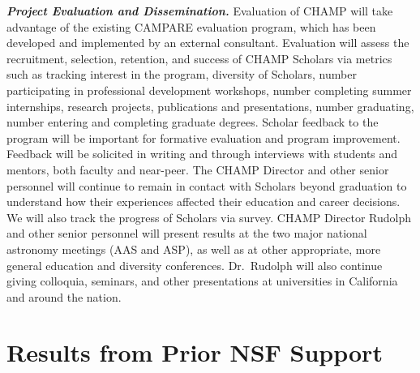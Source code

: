 \documentclass[preprint,11pt]{aastex}
\begin{document}
\emph{\textbf{Project Evaluation and Dissemination.}}
Evaluation of CHAMP will take advantage of the existing CAMPARE evaluation program, which has been developed and implemented by an external consultant. Evaluation will assess the recruitment, selection, retention, and success of CHAMP Scholars via metrics such as tracking interest in the program, diversity of Scholars, number participating in professional development workshops, number completing summer internships, research projects, publications and presentations, number graduating, number entering and completing graduate degrees. Scholar feedback to the program will be important for formative evaluation and program improvement. Feedback will be solicited in writing and through interviews with students and mentors, both faculty and near-peer. The CHAMP Director and other senior personnel will continue to remain in contact with Scholars beyond graduation to understand how their experiences affected their education and career decisions. We will also track the progress of Scholars via survey.  CHAMP Director Rudolph and other senior personnel will present results at the two major national astronomy meetings
(AAS
and ASP), as well as at other appropriate, more general education and diversity conferences. Dr.\ Rudolph will also continue giving colloquia, seminars, and other presentations at universities in California and around the nation.





\vspace{-18pt}
\section{Results from Prior NSF Support} \label{sec:NSF}
\vspace{-5pt}

\end{document}

